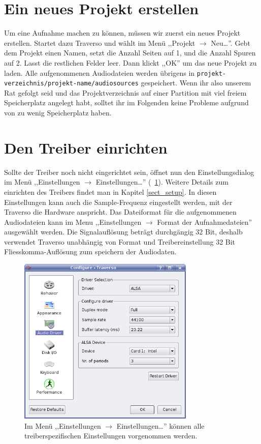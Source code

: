 \section{Ein neues Projekt erstellen}
Um eine Aufnahme machen zu können, müssen wir zuerst ein neues Projekt erstellen. Startet dazu Traverso und wählt im Menü ,,Projekt $\rightarrow$ Neu\dots''. Gebt dem Projekt einen Namen, setzt die Anzahl Seiten auf 1, und die Anzahl Spuren auf 2. Lasst die restlichen Felder leer. Dann klickt ,,OK'' um das neue Projekt zu laden. Alle aufgenommenen Audiodateien werden übrigens in \texttt{projekt-verzeichnis/projekt-name/audiosources} gespeichert. Wenn ihr also unserem Rat gefolgt seid und das Projektverzeichnis auf einer Partition mit viel freiem Speicherplatz angelegt habt, solltet ihr im Folgenden keine Probleme aufgrund von zu wenig Speicherplatz haben.

\section{Den Treiber einrichten}
Sollte der Treiber noch nicht eingerichtet sein, öffnet nun den Einstellungsdialog im Menü ,,Einstellungen $\rightarrow$ Einstellungen\dots'' (\FigB\ \ref{fig_driversettings}). Weitere Details zum einrichten des Treibers findet man in Kapitel \ref{sect_setup}. In diesen Einstellungen kann auch die Sample-Frequenz eingestellt werden, mit der Traverso die Hardware anspricht. Das Dateiformat für die aufgenommenen Audiodateien kann im Menu ,,Einstellungen $\rightarrow$ Format der Aufnahmedateien'' ausgewählt werden. Die Signalauflösung beträgt durchgängig 32 Bit, deshalb verwendet Traverso unabhängig von Format und Treibereinstellung 32 Bit Fliesskomma-Auflösung zum speichern der Audiodaten.

\begin{figure}
 \centering\includegraphics[width=0.75\textwidth]{images/driversettings.png}
 \caption{Im Menü ,,Einstellungen $\rightarrow$ Einstellungen\dots'' können alle treiberspezifischen Einstellungen vorgenommen werden.}
 \label{fig_driversettings}
\end{figure}

